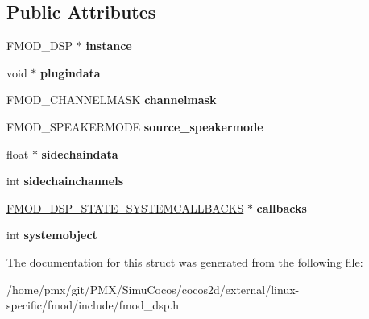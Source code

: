 \subsection*{Public Attributes}
\begin{DoxyCompactItemize}
\item 
\mbox{\label{structFMOD__DSP__STATE_a237b17d52742d83ced1b38f0c9d487cc}} 
F\+M\+O\+D\+\_\+\+D\+SP $\ast$ {\bfseries instance}
\item 
\mbox{\label{structFMOD__DSP__STATE_a343133eb99b15317082d94436196dbb4}} 
void $\ast$ {\bfseries plugindata}
\item 
\mbox{\label{structFMOD__DSP__STATE_a19d66dedcbccec2671ad65b6e546aa93}} 
F\+M\+O\+D\+\_\+\+C\+H\+A\+N\+N\+E\+L\+M\+A\+SK {\bfseries channelmask}
\item 
\mbox{\label{structFMOD__DSP__STATE_ad37c35be3104130b30239a5770ae7785}} 
F\+M\+O\+D\+\_\+\+S\+P\+E\+A\+K\+E\+R\+M\+O\+DE {\bfseries source\+\_\+speakermode}
\item 
\mbox{\label{structFMOD__DSP__STATE_aeb85891138109aedceed04c92a3493e9}} 
float $\ast$ {\bfseries sidechaindata}
\item 
\mbox{\label{structFMOD__DSP__STATE_a8380e0c924580c3879efaaf9dc7bac20}} 
int {\bfseries sidechainchannels}
\item 
\mbox{\label{structFMOD__DSP__STATE_a7ba9196b7c74f327463742e88b690502}} 
\hyperlink{structFMOD__DSP__STATE__SYSTEMCALLBACKS}{F\+M\+O\+D\+\_\+\+D\+S\+P\+\_\+\+S\+T\+A\+T\+E\+\_\+\+S\+Y\+S\+T\+E\+M\+C\+A\+L\+L\+B\+A\+C\+KS} $\ast$ {\bfseries callbacks}
\item 
\mbox{\label{structFMOD__DSP__STATE_aef6185a96d8c2d6f764dae07ec6265fe}} 
int {\bfseries systemobject}
\end{DoxyCompactItemize}


The documentation for this struct was generated from the following file\+:\begin{DoxyCompactItemize}
\item 
/home/pmx/git/\+P\+M\+X/\+Simu\+Cocos/cocos2d/external/linux-\/specific/fmod/include/fmod\+\_\+dsp.\+h\end{DoxyCompactItemize}
